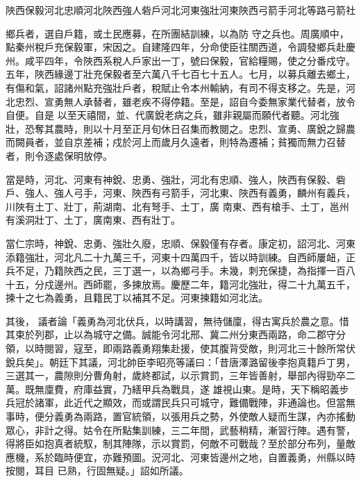 
\begin{pinyinscope}

 陜西保毅河北忠順河北陜西強人砦戶河北河東強壯河東陜西弓箭手河北等路弓箭社



 鄉兵者，選自戶籍，或土民應募，在所團結訓練，以為防
 守之兵也。周廣順中，點秦州稅戶充保毅軍，宋因之。自建隆四年，分命使臣往關西道，令調發鄉兵赴慶州。咸平四年，令陜西系稅人戶家出一丁，號曰保毅，官給糧賜，使之分番戍守。五年，陜西緣邊丁壯充保毅者至六萬八千七百七十五人。七月，以募兵離去鄉土，有傷和氣，詔諸州點充強壯戶者，稅賦止令本州輸納，有司不得支移之。先是，河北忠烈、宣勇無人承替者，雖老疾不得停籍。至是，詔自今委無家業代替者，放令自便。自是
 以至天禧間，並、代廣銳老病之兵，雖非親屬而願代者聽。河北強壯，恐奪其農時，則以十月至正月旬休日召集而教閱之。忠烈、宣勇、廣銳之歸農而闕員者，並自京差補；戍於河上而歲月久遠者，則特為遷補；貧獨而無力召替者，則令逐處保明放停。



 當是時，河北、河東有神銳、忠勇、強壯，河北有忠順、強人，陜西有保毅、砦戶、強人、強人弓手，河東、陜西有弓箭手，河北東、陜西有義勇，麟州有義兵，川陜有土丁、壯丁，荊湖南、北有弩手、土丁，廣
 南東、西有槍手、土丁，邕州有溪洞壯丁、土丁，廣南東、西有壯丁。



 當仁宗時，神銳、忠勇、強壯久廢，忠順、保毅僅有存者。康定初，詔河北、河東添籍強壯，河北凡二十九萬三千，河東十四萬四千，皆以時訓練。自西師屢衄，正兵不足，乃籍陜西之民，三丁選一，以為鄉弓手。未幾，刺充保捷，為指揮一百八十五，分戍邊州。西師罷，多揀放焉。慶歷二年，籍河北強壯，得二十九萬五千，揀十之七為義勇，且籍民丁以補其不足。河東揀籍如河北法。



 其後，
 議者論「義勇為河北伏兵，以時講習，無待儲廩，得古寓兵於農之意。惜其束於列郡，止以為城守之備。誠能令河北邢、冀二州分東西兩路，命二郡守分領，以時閱習，寇至，即兩路義勇翔集赴援，使其腹背受敵，則河北三十餘所常伏銳兵矣」。朝廷下其議，河北帥臣李昭亮等議曰：「昔唐澤潞留後李抱真籍戶丁男，三選其一，農隙則分曹角射，歲終都試，以示賞罰，三年皆善射，舉部內得勁卒二萬。既無廩費，府庫益實，乃繕甲兵為戰具，遂
 雄視山東。是時，天下稱昭義步兵冠於諸軍，此近代之顯效，而或謂民兵只可城守，難備戰陣，非通論也。但當無事時，便分義勇為兩路，置官統領，以張用兵之勢，外使敵人疑而生謀，內亦搖動眾心，非計之得。姑令在所點集訓練，三二年間，武藝稍精，漸習行陣。遇有警，得將臣如抱真者統馭，制其陣隊，示以賞罰，何敵不可戰哉？至於部分布列，量敵應機，系於臨時便宜，亦難預圖。況河北、河東皆邊州之地，自置義勇，州縣以時按閱，耳目
 已熟，行固無疑。」詔如所議。




\end{pinyinscope}
